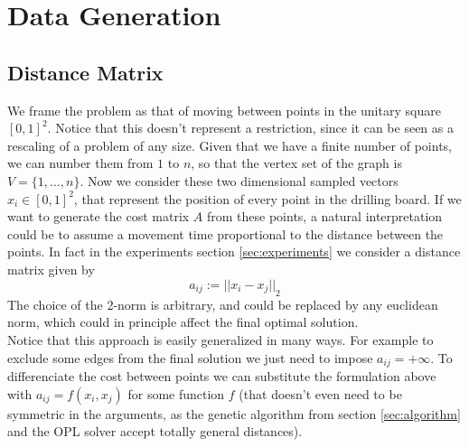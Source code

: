\documentclass{article}
\begin{document}
\section{Data Generation}\label{sec:data}
\subsection{Distance Matrix}
We frame the problem as that of moving between points in the unitary square $[0, 1]^2$. Notice that this doesn't represent a restriction, since it can be seen as a rescaling of a problem of any size. Given that we have a finite number of points, we can number them from $1$ to $n$, so that the vertex set of the graph is $V = \{ 1, \ldots, n  \}$. Now we consider these two dimensional sampled vectors $x_i \in [0, 1]^2 $, that represent the position of every point in the drilling board. If we want to generate the cost matrix $A$ from these points, a natural interpretation could be to assume a movement time proportional to the distance between the points. In fact in the experiments section \ref{sec:experiments} we consider a distance matrix given by
\begin{equation}\label{eq:cost}
a_{ij} := {|| x_i - x_j ||}_2
\end{equation} 
The choice of the 2-norm is arbitrary, and could be replaced by any euclidean norm, which could in principle affect the final optimal solution. \\
Notice that this approach is easily generalized in many ways. For example to exclude some edges from the final solution we just need to impose $a_{ij} = +\infty$. To differenciate the cost between points we can substitute the formulation above with $a_{ij} = f(x_i, x_j)$ for some function $f$ (that doesn't even need to be symmetric in the arguments, as the genetic algorithm from section \ref{sec:algorithm} and the OPL solver accept totally general distances).  
\end{document}
